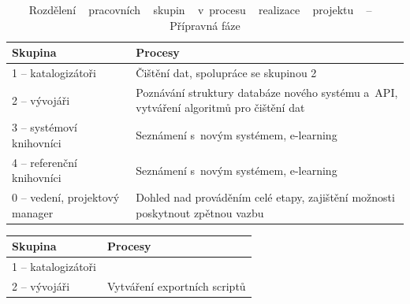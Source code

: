 \documentclass[
	11pt, oneside, printed, final, palatino
	microtype,
	table,   %
	lof,     %
	lot     %
]{fithesis3}
\newcommand{\bold}[1]{\textbf{#1}}
\begin{document}
{\begin{table}
    \centering
    \begin{tabular}{| p{3cm} | p{8.3cm} |}
    \hline
    \bold{Skupina} 	
    & 
    \bold{Procesy} 
    \\ \hline
    
    1 – katalogizátoři 
    & 
    Čištění dat, spolupráce se skupinou 2 
    \\ \hline
    
    2 – vývojáři 
    & 
	Poznávání struktury databáze nového systému a~API, vytváření algoritmů pro čištění dat	
    \\ \hline
    
    3 – systémoví knihovníci
    & 
    Seznámení s~novým systémem, e-learning
    \\ \hline
    
    4 – referenční knihovníci
    & 
    Seznámení s~novým systémem, e-learning
    \\ \hline

	0 – vedení, projektový manager
    & 
    Dohled nad prováděním celé etapy, zajištění možnosti poskytnout zpětnou vazbu
    \\ \hline
    
    \end{tabular}
    \caption{Rozdělení ~ pracovních ~  skupin ~  v~procesu ~  realizace ~  projektu ~ – ~ Přípravná fáze}
\end{table}
    
\begin{table}
    \centering
    \begin{tabular}{| p{3cm} | p{8.3cm} |}
    \hline
    \bold{Skupina} 	
    & 
    \bold{Procesy} 
    \\ \hline
    
	1 – katalogizátoři
    & 
    
    \\ \hline
    
	2 – vývojáři
    & 
    Vytváření exportních scriptů
    \\ \hline
    

\end{tabular}
\end{table}}
\end{document}

